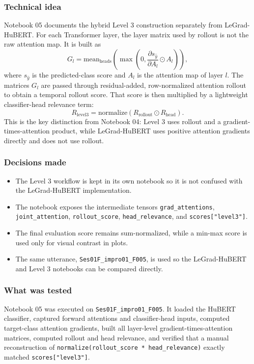 \documentclass[11pt]{article}
\begin{document}
\subsubsection*{Technical idea}
Notebook 05 documents the hybrid Level 3 construction separately from
LeGrad-HuBERT. For each Transformer layer, the layer matrix used by rollout is
not the raw attention map. It is built as
\[
G_l =
\mathrm{mean}_{\mathrm{heads}}\left(
\max\left(0,\frac{\partial s_{\hat{y}}}{\partial A_l}\odot A_l\right)
\right),
\]
where \(s_{\hat{y}}\) is the predicted-class score and \(A_l\) is the attention
map of layer \(l\). The matrices \(G_l\) are passed through residual-added,
row-normalized attention rollout to obtain a temporal rollout score. That score
is then multiplied by a lightweight classifier-head relevance term:
\[
R_{\mathrm{level3}} =
\mathrm{normalize}\left(
R_{\mathrm{rollout}} \odot R_{\mathrm{head}}
\right).
\]
This is the key distinction from Notebook 04: Level 3 uses rollout and a
gradient-times-attention product, while LeGrad-HuBERT uses positive attention
gradients directly and does not use rollout.

\subsubsection*{Decisions made}
\begin{itemize}
  \item The Level 3 workflow is kept in its own notebook so it is not confused
  with the LeGrad-HuBERT implementation.
  \item The notebook exposes the intermediate tensors
  \texttt{grad\_attentions}, \texttt{joint\_attention},
  \texttt{rollout\_score}, \texttt{head\_relevance}, and
  \texttt{scores["level3"]}.
  \item The final evaluation score remains sum-normalized, while a min-max
  score is used only for visual contrast in plots.
  \item The same utterance, \texttt{Ses01F\_impro01\_F005}, is used so the
  LeGrad-HuBERT and Level 3 notebooks can be compared directly.
\end{itemize}

\subsubsection*{What was tested}
Notebook 05 was executed on \texttt{Ses01F\_impro01\_F005}. It loaded the
HuBERT classifier, captured forward attentions and classifier-head inputs,
computed target-class attention gradients, built all layer-level
gradient-times-attention matrices, computed rollout and head relevance, and
verified that a manual reconstruction of
\texttt{normalize(rollout\_score * head\_relevance)} exactly matched
\texttt{scores["level3"]}.
\end{document}
